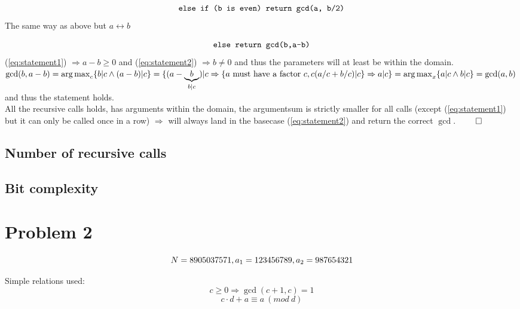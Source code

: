 \documentclass[a4paper,twoside=false,abstract=false,numbers=noenddot,
titlepage=false,headings=small,parskip=half,version=last]{scrartcl}
\DeclareMathOperator*{\argmax}{arg\,max}
\begin{document}
\begin{equation} \label{eq:statement5}
    \verb+else if (b is even) return gcd(a, b/2)+
\end{equation}
The same way as above but $a \leftrightarrow b$

\begin{equation*} \label{eq:statement6}
    \verb+else return gcd(b,a-b)+
\end{equation*}
(\ref{eq:statement1}) $\Rightarrow a-b \ge 0$ and (\ref{eq:statement2}) $\Rightarrow b \neq 0$ and thus the parameters will at least be within the domain. \\

$
    \gcd(b,a-b)=\argmax_c \{b|c \wedge (a-b)|c\}=\\
    \{ (a-\underbrace{b}_{b|c})|c \Rightarrow
    \{ \text{$a$ must have a factor $c$}, c(a/c+b/c)|c \} \Rightarrow
    a|c \}\\
    =\argmax_x\{a|c \wedge b|c\}=\gcd(a,b)
$
and thus the statement holds. \\

All the recursive calls holds, has arguments within the domain, the argumentsum is strictly smaller for all calls (except (\ref{eq:statement1}) but it can only be called once in a row) $\Rightarrow$ will always land in the basecase (\ref{eq:statement2}) and return the correct $\gcd$. $\qed$

\subsection{Number of recursive calls}

\subsection{Bit complexity}

\section{Problem 2}
\begin{equation*}
    N=8905037571, \\
    a_{1}=123456789, \\
    a_{2}=987654321
\end{equation*}

Simple relations used: 
\begin{equation} \label{eq:gcdplusone}
    c \ge 0 \Rightarrow  \gcd(c+1,c)=1
\end{equation}
\begin{equation} \label{eq:modrule}
    c\cdot d+a \equiv a\ (mod\ d) 
\end{equation}
\end{document}
